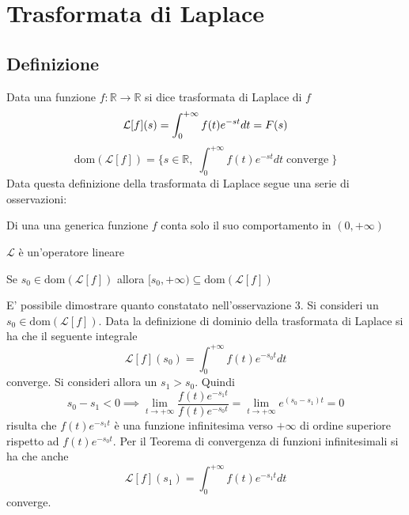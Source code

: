 
\section{Trasformata di Laplace}
        \subsection{Definizione}
            Data una funzione $f: \mathbb{R} \rightarrow \mathbb{R}$ si dice trasformata di Laplace di $f$
            \[
                \mathcal{L}[f](s) = \int_{0}^{+\infty} f(t)e^{-st} dt = F(s) \newline
            \]
            \[
                \text{dom}(\mathcal{L}[f]) = \{ s \in \mathbb{R}, \; \int_{0}^{+\infty} f(t)e^{-st} dt \; \text{converge} \; \}
            \]
            Data questa definizione della trasformata di Laplace segue una serie di osservazioni:

            \begin{osservazione}
                Di una una generica funzione $f$ conta solo il suo comportamento in $(0, +\infty)$
            \end{osservazione}

            \begin{osservazione}
                $\mathcal{L}$ è un'operatore lineare
            \end{osservazione}

            \begin{osservazione}
                Se $s_0 \in \text{dom}(\mathcal{L}[f])$ allora $[s_0, +\infty) \subseteq \text{dom}(\mathcal{L}[f])$
            \end{osservazione}

            E' possibile dimostrare quanto constatato nell'osservazione 3. Si consideri un $s_0 \in \text{dom}(\mathcal{L}[f])$.
            Data la definizione di dominio della trasformata di Laplace si ha che il seguente integrale
            \[
                \mathcal{L}[f](s_0) = \int_{0}^{+\infty} f(t) e^{-s_0 t} dt
            \]
            converge. Si consideri allora un $s_1 > s_0$. Quindi
            \[
                s_0 - s_1 < 0 \implies \lim_{t \rightarrow +\infty} \frac{f(t)e^{-s_1 t}}{f(t)e^{-s_0 t}} = \lim_{t \rightarrow +\infty} e^{(s_0 - s_1) t} = 0
            \]
            risulta che $f(t)e^{-s_1 t}$ è una funzione infinitesima verso $+\infty$ di ordine superiore rispetto ad $f(t)e^{-s_0 t}$. Per il Teorema di convergenza di funzioni infinitesimali si ha che anche
            \[
                \mathcal{L}[f](s_1) = \int_{0}^{+\infty} f(t) e^{-s_1 t} dt
            \]
            converge.

